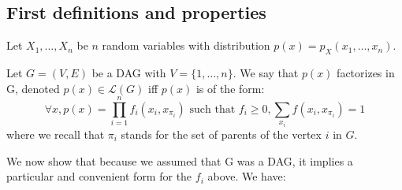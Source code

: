 \documentclass[12pt]{report}
\begin{document}
\subsection{First definitions and properties}

Let $X_1, \dots, X_n$ be $n$ random variables with distribution $p(x) = p_X (x_1, \dots, x_n)$. 
\begin{definition}
Let $G = (V,E)$ be a DAG with $V = \{1,\dots, n\}$. We say that $p(x)$ factorizes in G, denoted $p(x)\in \mathcal{L}(G)$ iff $p(x)$ is of the form:
\begin{equation}
\forall x, p(x) = \prod_{i=1}^n f_i(x_i, x_{\pi_i}) \text{ such that } f_i\geq 0, \sum_{x_i} f(x_i, x_{\pi_i}) = 1
\end{equation}
where we recall that $\pi_i$ stands for the set of parents of the vertex $i$ in $G$.
\end{definition}

We now show that because we assumed that G was a DAG, it implies a particular and convenient form for the $f_i$ above. We have: 
\end{document}
